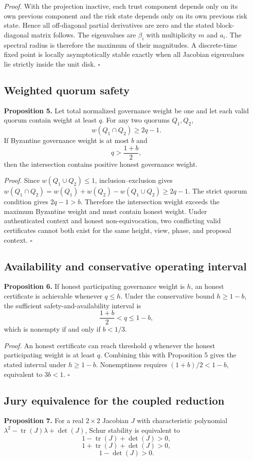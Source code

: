 \textit{Proof.} With the projection inactive, each trust component depends only on its own previous component and the risk state depends only on its own previous risk state. Hence all off-diagonal partial derivatives are zero and the stated block-diagonal matrix follows. The eigenvalues are $\beta_i$ with multiplicity $m$ and $a_i$. The spectral radius is therefore the maximum of their magnitudes. A discrete-time fixed point is locally asymptotically stable exactly when all Jacobian eigenvalues lie strictly inside the unit disk. \hfill$\square$

\subsection{Weighted quorum safety}
\textbf{Proposition 5.} Let total normalized governance weight be one and let each valid quorum contain weight at least $q$. For any two quorums $Q_1,Q_2$,
\[
w(Q_1\cap Q_2)\ge 2q-1.
\]
If Byzantine governance weight is at most $b$ and
\[
q>\frac{1+b}{2},
\]
then the intersection contains positive honest governance weight.

\textit{Proof.} Since $w(Q_1\cup Q_2)\le1$, inclusion--exclusion gives
$w(Q_1\cap Q_2)=w(Q_1)+w(Q_2)-w(Q_1\cup Q_2)\ge2q-1$. The strict quorum condition gives $2q-1>b$. Therefore the intersection weight exceeds the maximum Byzantine weight and must contain honest weight. Under authenticated context and honest non-equivocation, two conflicting valid certificates cannot both exist for the same height, view, phase, and proposal context. \hfill$\square$

\subsection{Availability and conservative operating interval}
\textbf{Proposition 6.} If honest participating governance weight is $h$, an honest certificate is achievable whenever $q\le h$. Under the conservative bound $h\ge1-b$, the sufficient safety-and-availability interval is
\[
\frac{1+b}{2}<q\le1-b,
\]
which is nonempty if and only if $b<1/3$.

\textit{Proof.} An honest certificate can reach threshold $q$ whenever the honest participating weight is at least $q$. Combining this with Proposition 5 gives the stated interval under $h\ge1-b$. Nonemptiness requires $(1+b)/2<1-b$, equivalent to $3b<1$. \hfill$\square$

\subsection{Jury equivalence for the coupled reduction}
\textbf{Proposition 7.} For a real $2\times2$ Jacobian $J$ with characteristic polynomial $\lambda^2-\operatorname{tr}(J)\lambda+\det(J)$, Schur stability is equivalent to
\[
1-\operatorname{tr}(J)+\det(J)>0,
\]
\[
1+\operatorname{tr}(J)+\det(J)>0,
\]
\[
1-\det(J)>0.
\]

